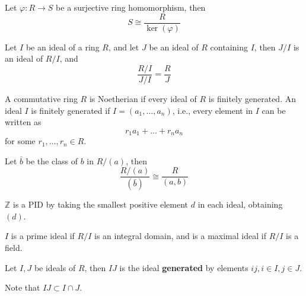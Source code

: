 \documentclass[openany]{book}
\newcommand{\Z}{\mathbb{Z}}
\begin{document}
\begin{thm}
    Let $\varphi:R\to S$ be a surjective ring homomorphism, then 
    \begin{equation*}
        S\cong\frac{R}{\ker(\varphi)}
    \end{equation*}
\end{thm}


\begin{prop}
    Let $I$ be an ideal of a ring $R$, and let $J$ be an ideal of $R$ containing $I$, then $J/I$ is an ideal of $R/I$, and 
    \begin{equation*}
        \frac{R/I}{J/I}=\frac{R}{J}
    \end{equation*}
\end{prop}


\begin{defn}[Noetherian]
    A commutative ring $R$ is Noetherian if every ideal of $R$ is finitely generated. An ideal $I$ is finitely generated if $I=(a_1,\dots,a_n)$, i.e., every element in $I$ can be written as 
    \begin{equation*}
        r_1a_1+\dots+r_na_n
    \end{equation*}
    for some $r_1,\dots, r_n\in R$.
\end{defn}

\begin{prop}
    Let $\bar{b}$ be the class of $b$ in $R/(a)$, then 
    \begin{equation*}
        \frac{R/(a)}{(\bar{b})}\cong\frac{R}{(a,b)}
    \end{equation*}
\end{prop}
\begin{prop}
    $\Z$ is a PID by taking the smallest positive element $d$ in each ideal, obtaining $(d)$.
\end{prop}


\begin{defn}
    $I$ is a prime ideal if $R/I$ is an integral domain, and is a maximal ideal if $R/I$ is a field.
\end{defn}
\begin{defn}
    Let $I,J$ be ideals of $R$, then $IJ$ is the ideal \textbf{generated} by elements $ij, i\in I, j\in J$.

    Note that $IJ\subset I\cap J$. 
\end{defn}
\end{document}
